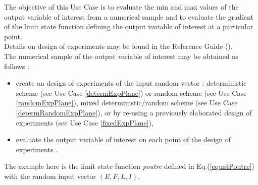 \renewcommand{\filename}{docUC_MinMax_Evaluation.tex}
\renewcommand{\filetitle}{UC : Min/Max research  from an design of experiments  and sensitivity analysis}

\HeaderIIILevel



The objective of this Use Case is to evaluate the min and max values of the output variable of interest from a numerical sample and to evaluate the gradient of the limit state function defining the output variable of interest at a particular point. \\

Details on design of experiments   may be found in the Reference Guide ().\\

The numerical sample of the output variable of interest may be obtained as follows :
\begin{itemize}
\item create an design of experiments  of the input random vector : deterministic scheme (see Use Case \ref{determExpPlane}) or random scheme (see Use Case \ref{randomExpPlane}), mixed deterministic/random scheme (see Use Case \ref{determRandomExpPlane}), or by re-using a previously elaborated design of experiments  (see Use Case \ref{fixedExpPlane}),
\item evaluate the output variable of interest on each point of the design of experiments .
\end{itemize}

The example here is the limit state function {\itshape poutre} defined in Eq.(\ref{equatPoutre}) with the random input vector $(E,F,L,I)$.\\

